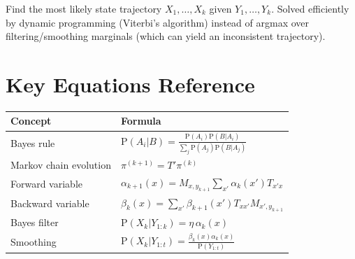 \documentclass[12pt, a4paper]{article}
\begin{document}
Find the most likely state trajectory $X_1,\ldots,X_k$ given
$Y_1,\ldots,Y_k$. Solved efficiently by dynamic programming (Viterbi's
algorithm) instead of argmax over filtering/smoothing marginals (which
can yield an inconsistent trajectory).

\section{Key Equations Reference}

\begin{center}
\renewcommand{\arraystretch}{1.6}
\begin{tabular}{ll}
\hline
\textbf{Concept} & \textbf{Formula} \\
\hline
Bayes rule & $\mathrm{P}(A_i|B)=\frac{\mathrm{P}(A_i)\mathrm{P}(B|A_i)}{\sum_j\mathrm{P}(A_j)\mathrm{P}(B|A_j)}$ \\
Markov chain evolution & $\pi^{(k+1)}=T'\pi^{(k)}$ \\
Forward variable & $\alpha_{k+1}(x)=M_{x,y_{k+1}}\sum_{x'}\alpha_k(x')T_{x'x}$ \\
Backward variable & $\beta_k(x)=\sum_{x'}\beta_{k+1}(x')T_{xx'}M_{x',y_{k+1}}$ \\
Bayes filter & $\mathrm{P}(X_k|Y_{1:k})=\eta\,\alpha_k(x)$ \\
Smoothing & $\mathrm{P}(X_k|Y_{1:t})=\frac{\beta_k(x)\alpha_k(x)}{\mathrm{P}(Y_{1:t})}$ \\
\hline
\end{tabular}
\end{center}
\end{document}
